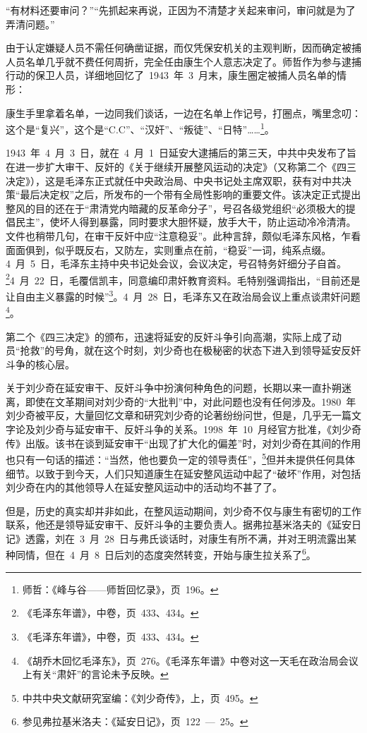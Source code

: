“有材料还要审问？”“先抓起来再说，正因为不清楚才关起来审问，审问就是为了弄清问题。”

由于认定嫌疑人员不需任何确凿证据，而仅凭保安机关的主观判断，因而确定被捕人员名单几乎就不费任何周折，完全任由康生个人意志决定了。师哲作为参与逮捕行动的保卫人员，详细地回忆了~1943~年~3~月末，康生圈定被捕人员名单的情形：


\begin{quoting}
康生手里拿着名单，一边同我们谈话，一边在名单上作记号，打圈点，嘴里念叨：这个是“复兴”，这个是“C.C”、“汉奸”、“叛徒”、“日特”……\footnote{师哲：《峰与谷——师哲回忆录》，页~196。}。
\end{quoting}

1943~年~4~月~3~日，就在~4~月~1~日延安大逮捕后的第三天，中共中央发布了旨在进一步扩大审干、反奸的《关于继续开展整风运动的决定》（又称第二个《四三决定》），这是毛泽东正式就任中央政治局、中央书记处主席双职，获有对中共决策“最后决定权”之后，所发布的一个带有全局性影响的重要文件。该决定正式提出整风的目的还在于“肃清党内暗藏的反革命分子”，号召各级党组织“必须极大的提倡民主”，使坏人得到暴露，同时要求大胆怀疑，放手大干，防止运动冷冷清清。文件也稍带几句，在审干反奸中应“注意稳妥”。此种言辞，颇似毛泽东风格，乍看面面俱到，似乎既反右，又防左，实则重点在前，“稳妥”一词，纯系点缀。4~月~5~日，毛泽东主持中央书记处会议，会议决定，号召特务奸细分子自首。\footnote{《毛泽东年谱》，中卷，页~433、434。}4~月~22~日，毛覆信凯丰，同意编印肃奸教育资料。毛特别强调指出，“目前还是让自由主义暴露的时候”\footnote{《毛泽东年谱》，中卷，页~433、434。}。4~月~28~日，毛泽东又在政治局会议上重点谈肃奸问题\footnote{《胡乔木回忆毛泽东》，页~276。《毛泽东年谱》中卷对这一天毛在政治局会议上有关“肃奸”的言论未予反映。}。

第二个《四三决定》的颁布，迅速将延安的反奸斗争引向高潮，实际上成了动员“抢救”的号角，就在这个时刻，刘少奇也在极秘密的状态下进入到领导延安反奸斗争的核心层。

关于刘少奇在延安审干、反奸斗争中扮演何种角色的问题，长期以来一直扑朔迷离，即使在文革期间对刘少奇的“大批判”中，对此问题也没有任何涉及。1980~年刘少奇被平反，大量回忆文章和研究刘少奇的论著纷纷问世，但是，几乎无一篇文字论及刘少奇与延安审干、反奸斗争的关系。1998~年~10~月经官方批准，《刘少奇传》出版。该书在谈到延安审干“出现了扩大化的偏差”时，对刘少奇在其间的作用也只有一句话的描述：“当然，他也要负一定的领导责任”，\footnote{中共中央文献研究室编：《刘少奇传》，上，页~495。}但并未提供任何具体细节。以致于到今天，人们只知道康生在延安整风运动中起了“破坏”作用，对包括刘少奇在内的其他领导人在延安整风运动中的活动均不甚了了。

但是，历史的真实却并非如此，在整风运动期间，刘少奇不仅与康生有密切的工作联系，他还是领导延安审干、反奸斗争的主要负责人。据弗拉基米洛夫的《延安日记》透露，刘在~3~月~28~日与弗氏谈话时，对康生有所不满，并对王明流露出某种同情，但在~4~月~8~日后刘的态度突然转变，开始与康生拉关系了\footnote{参见弗拉基米洛夫：《延安日记》，页~122~—~25。}。

